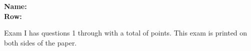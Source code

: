 \documentclass[12pt,fleqn]{exam}
\begin{document}
\newcommand{\reals}{\mathbf{R}}
\newcommand{\integers}{\mathbf{Z}}
\newcommand{\bi}{\mathbf{i}}
\newcommand{\bj}{\mathbf{j}}
\newcommand{\bk}{mathbf{k}}

\newcommand{\Mod}[1]{\ \mathrm{mod}\ #1}
\newcommand{\ex}{I}
\newenvironment{alphalist}{
  \begin{enumerate}[(a)]
    \addtolength{\itemsep}{-1.0\itemsep}}
  {\end{enumerate}}

\newenvironment{handlist}{
  \begin{enumerate}[\leftthumbsup]
    \addtolength{\itemsep}{-1.0\itemsep}}
  {\end{enumerate}}

\large
\vspace{0.1in}
\noindent{}
{\bf Name:}\hrulefill\\
\noindent \makebox[3.0truein][l]{\bf Exam \ex \/}
{\bf Row:}\hrulefill\

\large

\vspace{0.1in}

\noindent Exam \ex\/  has questions 1 through  \numquestions \/ with a total of \numpoints \/ points.  This exam is printed on both sides of the paper.
\end{document}
